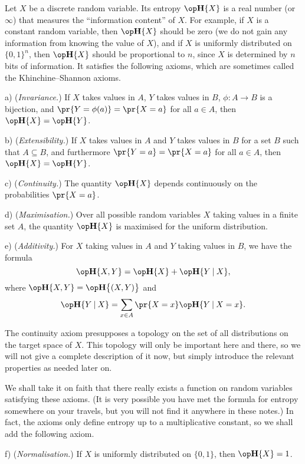 Let $X$ be a discrete random variable. Its entropy $\Eta\{X\}$ is a real number
(or $\infty$) that measures the ``information content'' of $X$. For example, if $X$ is
a constant random variable, then $\Eta\{X\}$ should be zero (we do not gain any information
from knowing the value of $X$), and if $X$ is
uniformly distributed on $\{0,1\}^n$, then $\Eta\{X\}$ should be proportional to $n$, since $X$ is
determined by
$n$ bits of information.
It satisfies the following axioms, which are
sometimes called the Khinchine--Shannon axioms.
\medskip
\item{a)} ({\it Invariance.}) If $X$ takes values in $A$, $Y$ takes values in $B$,
$\phi:A\to B$ is a bijection, and $\pr\{Y = \phi(a)\} = \pr\{X = a\}$ for all $a\in A$,
then $\Eta\{X\} = \Eta\{Y\}$.
\smallskip
\item{b)} ({\it Extensibility.}) If $X$ takes values in $A$ and $Y$ takes values in $B$ for
a set $B$ such that $A\subseteq B$, and furthermore $\pr\{Y=a\} = \pr\{X=a\}$ for all $a\in A$,
then $\Eta\{X\} = \Eta\{Y\}$.
\smallskip
\item{c)} ({\it Continuity.}) The quantity $\Eta\{X\}$ depends continuously on the probabilities
$\pr\{X=a\}$.
\smallskip
\item{d)} ({\it Maximisation.}) Over all possible random variables $X$ taking values in a finite
set $A$, the quantity $\Eta\{X\}$ is maximised for the uniform distribution.
\smallskip
\item{e)} ({\it Additivity.})
For $X$ taking values in $A$ and $Y$ taking values in $B$, we have the formula
$$ \Eta\{X,Y\} = \Eta\{X\} + \Eta\{ Y \given X\},$$
where $\Eta\{X,Y\} = \Eta\bigl\{ (X,Y)\bigr\}$ and
$$ \Eta\{Y\given X\} = \sum_{x\in A} \pr\{X=x\} \Eta\{ Y\given X = x\}.$$
\medskip

The continuity axiom presupposes a topology on the set of all distributions on the target
space of $X$. This topology will only be important here and there, so we will not give a complete
description of it now, but simply introduce the relevant properties as needed later on.

We shall take it on faith that there really exists a function on random variables satisfying
these axioms.
(It is very possible you have met the formula for entropy
somewhere on your travels, but you will not find it anywhere in
these notes.)
In fact, the axioms only define entropy
up to a multiplicative constant, so we shall add the following axiom.

\medskip
\item{f)} ({\it Normalisation.}) If $X$ is uniformly distributed on $\{0,1\}$, then
$\Eta\{X\} = 1$.
\medskip

